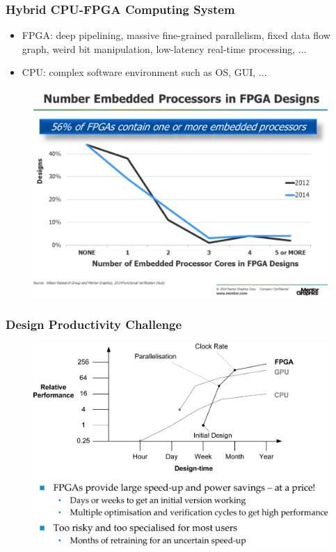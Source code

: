 \documentclass[accentcolor=tud1a,colorbacktitle,inverttitle,landscape,german,presentation,t]{tudbeamer}
\begin{document}
  \begin{frame}
  \frametitle{Hybrid CPU-FPGA Computing System}
    \vspace{-0.7em}
    \begin{itemize}
    \item FPGA: deep pipelining, massive fine-grained parallelism, 
      fixed data flow graph, weird bit manipulation, low-latency 
      real-time processing, ...
    \item CPU: complex software environment such as OS, GUI, ...
    \end{itemize}
    \begin{figure}
      \includegraphics[width=.6\linewidth]{fpga-accelerator}
    \end{figure}
  \end{frame}

   \begin{frame}
   \frametitle{Design Productivity Challenge}
   \begin{figure}
      \includegraphics[width=.85\linewidth]{design-challenge}
   \end{figure}   
   \end{frame}
   
\end{document}
